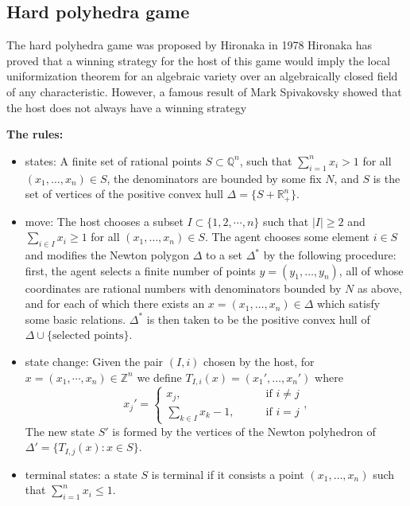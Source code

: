 \documentclass{article}
\theoremstyle{plain}
\theoremstyle{definition}
\theoremstyle{remark}
\begin{document}
\subsection{Hard polyhedra game} 

The hard polyhedra game was proposed by Hironaka in 1978 \cite{hironaka2}
Hironaka has proved that a winning strategy for the host of this game would imply the local uniformization theorem for an
algebraic variety over an algebraically closed field of any characteristic.
However, a famous result of Mark Spivakovsky \cite{spivakovsky} showed that the host does not always have a winning strategy

\textbf{The rules:}
\begin{itemize}
\item states: A finite set of rational points $S \subset \mathbb{Q}^n$, such that $\sum_{i=1}^n x_i>1$ for all 
$(x_1,\ldots, x_n)\in S$, the denominators are bounded by some fix $N$, and $S$ is the set of vertices of the positive 
convex hull $\Delta=\{S+\mathbb{R}^n_+\}$. 
\item move: The host chooses a subset $I\subset \{1,2,\cdots, n\}$ such that $|I|\geq 2$ and 
$\sum_{i\in I}x_i\ge 1$ for all $(x_1,\ldots, x_n)\in S$. 
The agent chooses some element $i\in S$ and modifies the Newton polygon $\Delta$ to a set $\Delta^*$ by
the following procedure: first, the agent selects a finite number of points $y=(y_1,\ldots, y_n)$, all of whose 
coordinates are rational numbers with denominators bounded by $N$ as above, and for each of which there exists
an $x = (x_1, \ldots, x_n)\in \Delta$ which satisfy some basic relations. $\Delta^*$ is then taken to be the positive 
convex hull of $\Delta \cup \{\text{selected points}\}$.

\item state change: Given the pair $(I,i)$ chosen by the host, for $x=(x_1,\cdots,x_n)\in \mathbb Z^n$ we define
$T_{I,i}(x)=(x_1',\ldots, x_n')$ where 
$$x_j' = \begin{cases}x_j, &\qquad\text{if } i\neq j \\ \sum\limits_{k\in I} x_k -1, &\qquad\text{if }i=j
\end{cases},$$
The new state $S'$ is formed by the vertices of the Newton polyhedron of $\Delta'=\{T_{I,j}(x):x\in S\}$.
\item terminal states: a state $S$ is terminal if it consists a point $(x_1,\ldots, x_n)$ such that 
$\sum_{i=1}^n x_i \le 1$. 
\end{itemize}
\end{document}
